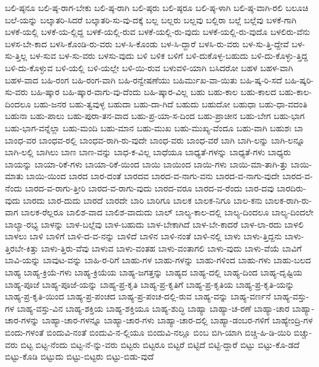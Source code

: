 {ಬಲಿ-ಷ್ಠನೂ
ಬಲಿ-ಷ್ಠ-ರಾಗ-ಬೇಕು
ಬಲಿ-ಷ್ಠ-ರಾಗಿ
ಬಲಿ-ಷ್ಠರು
ಬಲಿ-ಷ್ಠರೂ
ಬಲಿ-ಷ್ಠ-ಳಾಗಿ
ಬಲಿ-ಷ್ಠ-ವಾಗಿ-ರಲಿ
ಬಲೂಚಿ
ಬಲೆ-ಯನ್ನು
ಬಲ್ಕಾತರಿ-ಸಿದರೆ
ಬಲ್ಕಾತರಿ-ಸು-ವು-ದಕ್ಕೆ
ಬಲ್ಲ
ಬಲ್ಲರು
ಬಲ್ಲವು
ಬಲ್ಲಿರಾ
ಬಲ್ಲೆ
ಬಲ್ಲೆವು
ಬಳಕೆ-ಗಾಗಿ
ಬಳಕೆ-ಯಲ್ಲಿ
ಬಳಕೆ-ಯ-ಲ್ಲಿದ್ದ
ಬಳಕೆ-ಯಲ್ಲಿ-ರುವ
ಬಳಕೆ-ಯಲ್ಲಿ-ರು-ವುದು
ಬಳಕೆ-ಯಲ್ಲಿ-ರು-ವುದೊ
ಬಳಲಿರು-ವೆನು
ಬಳಸ-ಬೇ-ಕಾದ
ಬಳಸಿ-ಕೊಂಡಿ-ರು-ವರು
ಬಳ-ಸಿ-ಕೊಂಡು
ಬಳ-ಸಿ-ದ್ದಾರೆ
ಬಳಸಿ-ರು-ವರು
ಬಳ-ಸು-ತ್ತಿ-ದ್ದೇವೆ
ಬಳ-ಸು-ತ್ತಿಲ್ಲ
ಬಳ-ಸುವ
ಬಳ-ಸು-ವರು
ಬಳಸು-ವುದು
ಬಳಿ
ಬಳಿಕ
ಬಳಿಗೆ
ಬಳಿ-ದುಕೊಳ್ಳ-ಬಹುದು
ಬಳಿ-ದು-ಕೊಳ್ಳು-ತ್ತಿದ್ದ
ಬಳಿ-ದು-ಕೊಳ್ಳುವ
ಬಳಿ-ಯಲ್ಲಿ
ಬಳಿ-ಯಲ್ಲೇ
ಬಳಿ-ಯಿ-ರುವ
ಬಳುವಳಿ-ಯಾಗಿ
ಬಸಿದರೋ
ಬಹಳ
ಬಹಳ-ವಾಗಿ
ಬಹಳ-ವಾದ
ಬಹಿ-ರಂಗ
ಬಹಿ-ರಂಗ-ವಾಗಿ
ಬಹಿ-ರನ್ವೇಷಣೆಯು
ಬಹಿರ್ಮುಖ-ವಾ-ಯಿತು
ಬಹಿ-ಷ್ಕ-ರಿ-ಸದೆ
ಬಹಿ-ಷ್ಕರಿ-ಸು-ವರು
ಬಹಿ-ಷ್ಕಾರ
ಬಹಿ-ಷ್ಕಾರ-ವಾಗು-ವು-ದೆಂದು
ಬಹಿ-ಷ್ಕಾರ-ವಿಲ್ಲ
ಬಹು
ಬಹು-ಕಾಲ
ಬಹು-ಕಾಲದ
ಬಹು-ಕಾಲ-ದಿಂದಲೂ
ಬಹು-ಜನರ
ಬಹು-ತ್ವವುಳ್ಳ
ಬಹುದಾ
ಬಹು-ದಾ-ಗಿದೆ
ಬಹುದು
ಬಹುದೋ
ಬಹುಧಾ
ಬಹು-ಧಾ-ವದಂತಿ
ಬಹುನಾ
ಬಹು-ಪಾಲು
ಬಹು-ಪುರಾ-ತನ-ವಾದ
ಬಹು-ಪ್ರ-ಯಾ-ಸ-ದಿಂದ
ಬಹು-ಪ್ರಾಚೀನ
ಬಹು-ಬೇಗ
ಬಹು-ಭಾಗ
ಬಹು-ಭಾಗ-ವನ್ನೆಲ್ಲಾ
ಬಹು-ಮಂದಿ
ಬಹು-ಮಾನ
ಬಹು-ಮುಖ
ಬಹು-ಮುಖ್ಯ-ವೆಂದೂ
ಬಹು-ವಾಗಿ
ಬಹುಶಃ
ಬಾ
ಬಾಂಧ-ವರ
ಬಾಂಧವ-ರಲ್ಲಿ
ಬಾಂಧವ-ರಾಗಿ-ರು-ವುದೇ
ಬಾಂಧ-ವರು
ಬಾಂಧ-ವರೆ
ಬಾಗಿ
ಬಾಗಿ-ಲನ್ನು
ಬಾಗಿ-ಲನ್ನೂ
ಬಾಗಿ-ಲಲ್ಲಿ
ಬಾಗಿಲು
ಬಾಣ
ಬಾಣ-ವನ್ನು
ಬಾಧ-ಕ-ವಿಲ್ಲ
ಬಾಧೆಯೂ
ಬಾಧ್ಯತೆ-ಗಳನ್ನು
ಬಾಧ್ಯತೆ-ಗಳು
ಬಾಧ್ಯರು
ಬಾಯನ್ನು
ಬಾಯಾ-ರಿಕೆ-ಗಳು
ಬಾಯಾ-ರಿಕೆ-ಯಿಂದ
ಬಾಯಿ
ಬಾಯಿಂದ
ಬಾಯಿ-ಗಳು
ಬಾಯಿ-ಮಾ-ತಾಗಿ-ತ್ತು
ಬಾಯಿ-ಮಾತು
ಬಾಯಿ-ಯಿಂದ
ಬಾರದ
ಬಾರ-ದಂತೆ
ಬಾರದವ
ಬಾರದ-ವ-ನಾಗು-ವನು
ಬಾರದ-ವ-ನಾಗು-ವುದೇ
ಬಾರದ-ವ-ನೆಂದು
ಬಾರದ-ವ-ರಾಗು-ತ್ತೀರಿ
ಬಾರದ-ವ-ರಾಗು-ವುದು
ಬಾರದ-ವರೂ
ಬಾರದ-ವ-ರೆಂದು
ಬಾರ-ದವು
ಬಾರದಿರು-ವುದು
ಬಾರದು
ಬಾರ-ದುದು
ಬಾರದೆ
ಬಾರದೇ
ಬಾರಿ
ಬಾರಿಗೂ
ಬಾಲಕ
ಬಾಲಕ-ನಿಗೂ
ಬಾಲ-ಕನು
ಬಾಲಕ-ರಾಗಿ-ರು-ವಾಗ
ಬಾಲಕ-ರೆಲ್ಲರೂ
ಬಾಲಿಶ-ವಾದ
ಬಾಲಿಶ-ವಾದುದು
ಬಾಲ್
ಬಾಲ್ಯ-ಕಾಲ-ದಲ್ಲಿ
ಬಾಲ್ಯ-ದಿಂದಲೂ
ಬಾಲ್ಯ-ದಿಂದಲೇ
ಬಾಲ್ಯಾ-ರಭ್ಯ
ಬಾಳನ್ನು
ಬಾಳ-ಬಲ್ಲೆವು
ಬಾಳ-ಬಹುದು
ಬಾಳ-ಬೇಕಾಗಿದೆ
ಬಾಳ-ಬೇ-ಕಾದರೆ
ಬಾಳ-ಲಾ-ರದು
ಬಾಳಲಿ
ಬಾಳಲು
ಬಾಳಿ
ಬಾಳಿಗೆ
ಬಾಳಿ-ದ-ವ-ನನ್ನು
ಬಾಳಿದೆ
ಬಾಳಿನ
ಬಾಳಿ-ನಂತೆ
ಬಾಳಿ-ನಲ್ಲಿ
ಬಾಳು
ಬಾಳು-ತ್ತಿದ್ದನು
ಬಾಳು-ತ್ತಿರಬೇ-ಕಿತ್ತು
ಬಾಳು-ತ್ತಿರು-ವೆವು
ಬಾಳುವ
ಬಾಳು-ವಂತಹ
ಬಾಳು-ವಂತಾಗಲಿ
ಬಾಳು-ವುದು
ಬಾಳು-ವೆಯೆ
ಬಾವಿಗೆ
ಬಾವಿ-ಯನ್ನು
ಬಾವುಟ-ವನ್ನು
ಬಾಹಿ-ರ-ರಿಗೆ
ಬಾಹು-ಗಳ
ಬಾಹು-ಗಳನ್ನು
ಬಾಹು-ಗಳಿಂದ
ಬಾಹು-ಗಳು
ಬಾಹು-ಬಲದ
ಬಾಹ್ಯ
ಬಾಹ್ಯ-ಕ್ರಿಯೆ-ಗಳು
ಬಾಹ್ಯ-ಕ್ರಿಯೆಯ
ಬಾಹ್ಯ-ಜಗತ್ತನ್ನು
ಬಾಹ್ಯದ
ಬಾಹ್ಯ-ದಲ್ಲಿ
ಬಾಹ್ಯ-ದಿಂದ
ಬಾಹ್ಯ-ದೃಷ್ಟಿಯ
ಬಾಹ್ಯ-ಪೂಜೆ
ಬಾಹ್ಯ-ಪೂಜೆ-ಯನ್ನು
ಬಾಹ್ಯ-ಪ್ರ-ಕೃತಿ
ಬಾಹ್ಯ-ಪ್ರ-ಕೃತಿಗೆ
ಬಾಹ್ಯ-ಪ್ರ-ಕೃತಿಯ
ಬಾಹ್ಯ-ಪ್ರ-ಕೃತಿ-ಯನ್ನು
ಬಾಹ್ಯ-ಪ್ರ-ಕೃತಿ-ಯಿಂದ
ಬಾಹ್ಯ-ಪ್ರ-ಪಂಚದ
ಬಾಹ್ಯ-ಪ್ರ-ಪಂಚ-ದಲ್ಲಿ-ರುವ
ಬಾಹ್ಯ-ವನ್ನು
ಬಾಹ್ಯ-ವರ್ಣನೆ
ಬಾಹ್ಯ-ವಸ್ತು-ಗಳ
ಬಾಹ್ಯ-ವಸ್ತು-ವಿನ
ಬಾಹ್ಯ-ಶಕ್ತಿಯ
ಬಾಹ್ಯ-ಶಕ್ತಿಯೂ
ಬಾಹ್ಯ-ಶುದ್ಧಿ
ಬಾಹ್ಯಾ
ಬಾಹ್ಯಾ-ಚ-ರಣೆ
ಬಾಹ್ಯಾ-ಚಾರ
ಬಾಹ್ಯಾ-ಚಾರ-ಗಳನ್ನು
ಬಾಹ್ಯಾ-ಚಾರ-ಗಳನ್ನೂ
ಬಾಹ್ಯಾ-ಚಾರ-ಗಳು
ಬಾಹ್ಯಾ-ಚಾರ-ದಲ್ಲಿ
ಬಾಹ್ಯಾ-ಡಂಬರ-ಗಳಿಗೆ
ಬಾಹ್ಯೇಂದ್ರಿ-ಗಳ
ಬಿಂದು-ಗಳಂತೆ
ಬಿಂದುವಿ-ನಂತೆ
ಬಿಂದುವಿ-ನ-ಲ್ಲಿಯೂ
ಬಿಂದುವಿ-ನಲ್ಲೂ
ಬಿಂಬ
ಬಿಗಿ-ಯಾಗಿ
ಬಿಚ್ಚಿ-ಹಿ-ಡಿ-ಯಿರಿ
ಬಿಚ್ಚು-ವರು
ಬಿಟ್ಟ
ಬಿಟ್ಟ-ನೆಂದು
ಬಿಟ್ಟ-ನೆ-ನ್ನು-ವರು
ಬಿಟ್ಟರು
ಬಿಟ್ಟರೂ
ಬಿಟ್ಟರೆ
ಬಿಟ್ಟಿದೆ
ಬಿಟ್ಟಿ-ದ್ದಾರೆ
ಬಿಟ್ಟು
ಬಿಟ್ಟು-ಕೊ-ಡದೆ
ಬಿಟ್ಟು-ಕೊಡಿ
ಬಿಟ್ಟುದು
ಬಿಟ್ಟು-ಬಿಟ್ಟರು
ಬಿಟ್ಟು-ಬಿಡು-ವುದೆ
}
